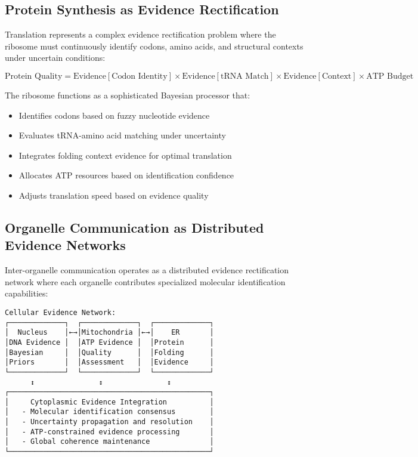 \documentclass[12pt,a4paper]{article}
\begin{document}
\subsection{Protein Synthesis as Evidence Rectification}

Translation represents a complex evidence rectification problem where the ribosome must continuously identify codons, amino acids, and structural contexts under uncertain conditions:

\begin{equation}
\text{Protein Quality} = \text{Evidence}[\text{Codon Identity}] \times \text{Evidence}[\text{tRNA Match}] \times \text{Evidence}[\text{Context}] \times \text{ATP Budget}
\end{equation}

The ribosome functions as a sophisticated Bayesian processor that:
\begin{itemize}
\item Identifies codons based on fuzzy nucleotide evidence
\item Evaluates tRNA-amino acid matching under uncertainty
\item Integrates folding context evidence for optimal translation
\item Allocates ATP resources based on identification confidence
\item Adjusts translation speed based on evidence quality
\end{itemize}

\subsection{Organelle Communication as Distributed Evidence Networks}

Inter-organelle communication operates as a distributed evidence rectification network where each organelle contributes specialized molecular identification capabilities:

\begin{verbatim}
Cellular Evidence Network:
┌─────────────┐  ┌─────────────┐  ┌─────────────┐
│  Nucleus    │←→│Mitochondria │←→│    ER       │
│DNA Evidence │  │ATP Evidence │  │Protein      │
│Bayesian     │  │Quality      │  │Folding      │
│Priors       │  │Assessment   │  │Evidence     │
└─────────────┘  └─────────────┘  └─────────────┘
      ↕               ↕               ↕
┌───────────────────────────────────────────────┐
│     Cytoplasmic Evidence Integration          │
│   - Molecular identification consensus        │
│   - Uncertainty propagation and resolution    │
│   - ATP-constrained evidence processing       │
│   - Global coherence maintenance              │
└───────────────────────────────────────────────┘
\end{verbatim}
\end{document}
